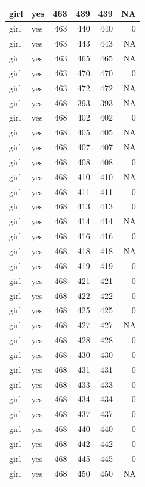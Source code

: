 \documentclass[man]{apa6}
\begin{document}
\begin{tabular}{l|l|r|r|r|r}
\hline
girl & yes & 463 & 439 & 439 & NA\\
\hline
girl & yes & 463 & 440 & 440 & 0\\
\hline
girl & yes & 463 & 443 & 443 & NA\\
\hline
girl & yes & 463 & 465 & 465 & NA\\
\hline
girl & yes & 463 & 470 & 470 & 0\\
\hline
girl & yes & 463 & 472 & 472 & NA\\
\hline
girl & yes & 468 & 393 & 393 & NA\\
\hline
girl & yes & 468 & 402 & 402 & 0\\
\hline
girl & yes & 468 & 405 & 405 & NA\\
\hline
girl & yes & 468 & 407 & 407 & NA\\
\hline
girl & yes & 468 & 408 & 408 & 0\\
\hline
girl & yes & 468 & 410 & 410 & NA\\
\hline
girl & yes & 468 & 411 & 411 & 0\\
\hline
girl & yes & 468 & 413 & 413 & 0\\
\hline
girl & yes & 468 & 414 & 414 & NA\\
\hline
girl & yes & 468 & 416 & 416 & 0\\
\hline
girl & yes & 468 & 418 & 418 & NA\\
\hline
girl & yes & 468 & 419 & 419 & 0\\
\hline
girl & yes & 468 & 421 & 421 & 0\\
\hline
girl & yes & 468 & 422 & 422 & 0\\
\hline
girl & yes & 468 & 425 & 425 & 0\\
\hline
girl & yes & 468 & 427 & 427 & NA\\
\hline
girl & yes & 468 & 428 & 428 & 0\\
\hline
girl & yes & 468 & 430 & 430 & 0\\
\hline
girl & yes & 468 & 431 & 431 & 0\\
\hline
girl & yes & 468 & 433 & 433 & 0\\
\hline
girl & yes & 468 & 434 & 434 & 0\\
\hline
girl & yes & 468 & 437 & 437 & 0\\
\hline
girl & yes & 468 & 440 & 440 & 0\\
\hline
girl & yes & 468 & 442 & 442 & 0\\
\hline
girl & yes & 468 & 445 & 445 & 0\\
\hline
girl & yes & 468 & 450 & 450 & NA\\

\end{tabular}
\end{document}
